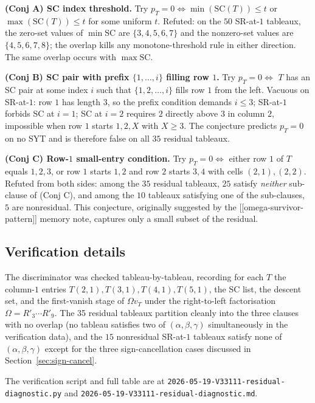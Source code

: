 \documentclass[11pt]{article}
\theoremstyle{definition}
\newcommand{\Om}{\Omega}
\begin{document}
\medskip
\noindent\textbf{(Conj A) SC index threshold.} Try
$p_T = 0 \Leftrightarrow \min(\mathrm{SC}(T)) \le t$ or
$\max(\mathrm{SC}(T)) \le t$ for some uniform $t$. Refuted: on the
$50$ SR-at-$1$ tableaux, the zero-set values of $\min \mathrm{SC}$ are
$\{3, 4, 5, 6, 7\}$ and the nonzero-set values are
$\{4, 5, 6, 7, 8\}$; the overlap kills any monotone-threshold rule in
either direction. The same overlap occurs with $\max \mathrm{SC}$.

\medskip
\noindent\textbf{(Conj B) SC pair with prefix $\{1, \ldots, i\}$
filling row $1$.} Try $p_T = 0 \Leftrightarrow$ $T$ has an SC pair at
some index $i$ such that $\{1, 2, \ldots, i\}$ fills row $1$ from the
left. Vacuous on SR-at-$1$: row $1$ has length $3$, so the prefix
condition demands $i \le 3$; SR-at-$1$ forbids SC at $i = 1$; SC at
$i = 2$ requires $2$ directly above $3$ in column $2$, impossible
when row $1$ starts $1, 2, X$ with $X \ge 3$. The conjecture predicts
$p_T = 0$ on no SYT and is therefore false on all $35$ residual
tableaux.

\medskip
\noindent\textbf{(Conj C) Row-$1$ small-entry condition.} Try
$p_T = 0 \Leftrightarrow$ either row $1$ of $T$ equals $1, 2, 3$, or
row $1$ starts $1, 2$ and row $2$ starts $3, 4$ with cells $(2,1),
(2,2)$. Refuted from both sides: among the $35$ residual tableaux,
$25$ satisfy \emph{neither} sub-clause of (Conj C), and among the
$10$ tableaux satisfying one of the sub-clauses, $5$ are nonresidual.
This conjecture, originally suggested by the
[[omega-survivor-pattern]] memory note, captures only a small subset
of the residual.

\subsection{Verification details}
The discriminator was checked tableau-by-tableau, recording for each
$T$ the column-$1$ entries $T(2,1), T(3,1), T(4,1), T(5,1)$, the SC
list, the descent set, and the first-vanish stage of $\Om v_T$
under the right-to-left factorisation $\Om = R'_3 \cdots R'_9$. The
35 residual tableaux partition cleanly into the three clauses with
no overlap (no tableau satisfies two of $(\alpha, \beta, \gamma)$
simultaneously in the verification data), and the $15$ nonresidual
SR-at-$1$ tableaux satisfy none of $(\alpha, \beta, \gamma)$ except
for the three sign-cancellation cases discussed in
Section~\ref{sec:sign-cancel}.

The verification script and full table are at
\texttt{2026-05-19-V33111-residual-diagnostic.py} and
\texttt{2026-05-19-V33111-residual-diagnostic.md}.
\end{document}
